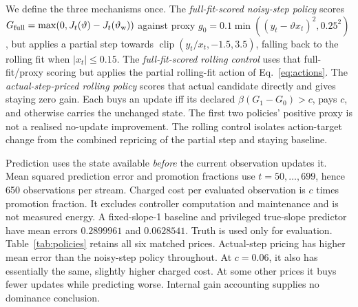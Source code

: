 We define the three mechanisms once. The \emph{full-fit-scored noisy-step policy} scores \(G_{\rm full}=\max(0,J_t(\vartheta)-J_t(\vartheta_{\mathrm w}))\) against proxy \(g_0=0.1\min((y_t-\vartheta x_t)^2,0.25^2)\), but applies a partial step towards \(\operatorname{clip}(y_t/x_t,-1.5,3.5)\), falling back to the rolling fit when \(|x_t|\leq0.15\). The \emph{full-fit-scored rolling control} uses that full-fit/proxy scoring but applies the partial rolling-fit action of Eq.~\eqref{eq:actions}. The \emph{actual-step-priced rolling policy} scores that actual candidate directly and gives staying zero gain. Each buys an update iff its declared \(\beta(G_1-G_0)>c\), pays \(c\), and otherwise carries the unchanged state. The first two policies' positive proxy is not a realised no-update improvement. The rolling control isolates action-target change from the combined repricing of the partial step and staying baseline.

Prediction uses the state available \emph{before} the current observation updates it. Mean squared prediction error and promotion fractions use \(t=50,\ldots,699\), hence 650 observations per stream. Charged cost per evaluated observation is \(c\) times promotion fraction. It excludes controller computation and maintenance and is not measured energy. A fixed-slope-1 baseline and privileged true-slope predictor have mean errors \(0.2899961\) and \(0.0628541\). Truth is used only for evaluation. Table~\ref{tab:policies} retains all six matched prices. Actual-step pricing has higher mean error than the noisy-step policy throughout. At \(c=0.06\), it also has essentially the same, slightly higher charged cost. At some other prices it buys fewer updates while predicting worse. Internal gain accounting supplies no dominance conclusion.

